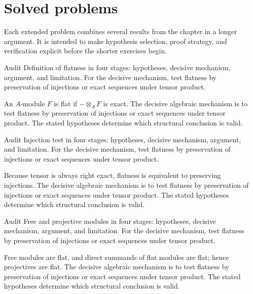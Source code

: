 \section{Solved problems}
Each extended problem combines several results from the chapter in a longer argument. It is intended to make hypothesis selection, proof strategy, and verification explicit before the shorter exercises begin.

\begin{problem}\label{prob:v14-problem-01}
Audit Definition of flatness in four stages: hypotheses, decisive mechanism, argument, and limitation. For the decisive mechanism, test flatness by preservation of injections or exact sequences under tensor product.
\end{problem}
\begin{solution}
An $A$-module $F$ is flat if $-\otimes_A F$ is exact. The decisive algebraic mechanism is to test flatness by preservation of injections or exact sequences under tensor product. The stated hypotheses determine which structural conclusion is valid.
\end{solution}

\begin{problem}\label{prob:v14-problem-02}
Audit Injection test in four stages: hypotheses, decisive mechanism, argument, and limitation. For the decisive mechanism, test flatness by preservation of injections or exact sequences under tensor product.
\end{problem}
\begin{solution}
Because tensor is always right exact, flatness is equivalent to preserving injections. The decisive algebraic mechanism is to test flatness by preservation of injections or exact sequences under tensor product. The stated hypotheses determine which structural conclusion is valid.
\end{solution}

\begin{problem}\label{prob:v14-problem-03}
Audit Free and projective modules in four stages: hypotheses, decisive mechanism, argument, and limitation. For the decisive mechanism, test flatness by preservation of injections or exact sequences under tensor product.
\end{problem}
\begin{solution}
Free modules are flat, and direct summands of flat modules are flat; hence projectives are flat. The decisive algebraic mechanism is to test flatness by preservation of injections or exact sequences under tensor product. The stated hypotheses determine which structural conclusion is valid.
\end{solution}

